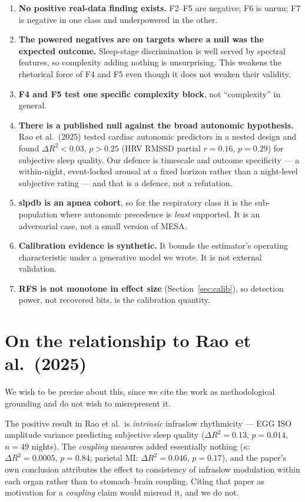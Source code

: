\documentclass[11pt]{article}
\begin{document}
\begin{enumerate}
  \item \textbf{No positive real-data finding exists.} F2--F5 are negative; F6 is
  unrun; F7 is negative in one class and underpowered in the other.
  \item \textbf{The powered negatives are on targets where a null was the expected
  outcome.} Sleep-stage discrimination is well served by spectral features, so
  complexity adding nothing is unsurprising. This weakens the rhetorical force of
  F4 and F5 even though it does not weaken their validity.
  \item \textbf{F4 and F5 test one specific complexity block}, not ``complexity''
  in general.
  \item \textbf{There is a published null against the broad autonomic
  hypothesis.} Rao et al.~(2025) tested cardiac autonomic predictors in a nested
  design and found $\Delta R^2 < 0.03$, $p > 0.25$ (HRV RMSSD partial
  $r = 0.16$, $p = 0.29$) for subjective sleep quality. Our defence is timescale
  and outcome specificity --- a within-night, event-locked arousal at a fixed
  horizon rather than a night-level subjective rating --- and that is a defence,
  not a refutation.
  \item \textbf{slpdb is an apnea cohort}, so for the respiratory class it is the
  sub-population where autonomic precedence is \emph{least} supported. It is an
  adversarial case, not a small version of MESA.
  \item \textbf{Calibration evidence is synthetic.} It bounds the estimator's
  operating characteristic under a generative model we wrote. It is not external
  validation.
  \item \textbf{RFS is not monotone in effect size} (Section~\ref{sec:calib}), so
  detection power, not recovered bits, is the calibration quantity.
\end{enumerate}

\section{On the relationship to Rao et al.\ (2025)}

We wish to be precise about this, since we cite the work as methodological
grounding and do not wish to misrepresent it.

The positive result in Rao et al.\ is \emph{intrinsic} infraslow rhythmicity ---
EGG ISO amplitude variance predicting subjective sleep quality
($\Delta R^2 = 0.13$, $p = 0.014$, $n = 49$ nights). The \emph{coupling} measures
added essentially nothing ($\kappa$: $\Delta R^2 = 0.0005$, $p = 0.84$; parietal
MI: $\Delta R^2 = 0.046$, $p = 0.17$), and the paper's own conclusion attributes
the effect to consistency of infraslow modulation within each organ rather than
to stomach--brain coupling. Citing that paper as motivation for a \emph{coupling}
claim would misread it, and we do not.
\end{document}

